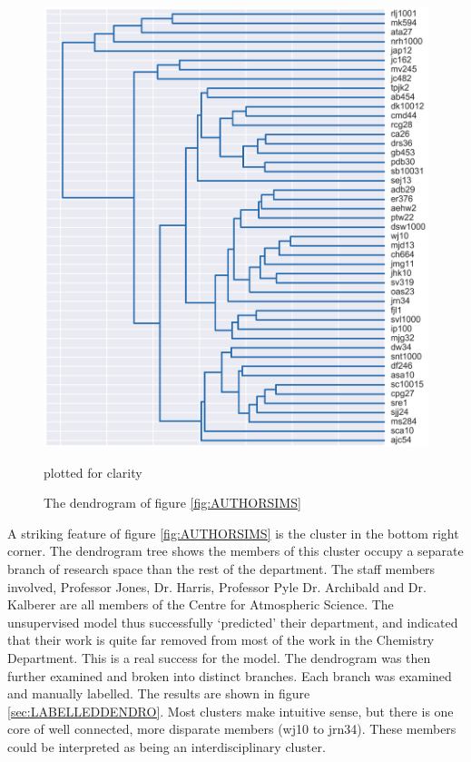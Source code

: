 \begin{center}
\begin{figure}[H]
\label{fig:DENDRO}
  \centering
    \includegraphics[scale=0.8]{Analysis/dendro.png}
    \caption{The dendrogram of figure \ref{fig:AUTHORSIMS}} plotted for clarity
\end{figure} 
\end{center}
A striking feature of figure \ref{fig:AUTHORSIMS} is the cluster in the bottom right corner. The dendrogram tree shows the members of this cluster occupy a separate branch of research space than the rest of the department. The staff members involved, Professor Jones, Dr. Harris, Professor Pyle Dr. Archibald and Dr. Kalberer are all members of the Centre for Atmospheric Science. The unsupervised model thus successfully `predicted' their department, and indicated that their work is quite far removed from most of the work in the Chemistry Department. This is a real success for the model. The dendrogram was then further examined and broken into distinct branches. Each branch was examined and manually labelled. The results are shown in figure \ref{sec:LABELLEDDENDRO}. Most clusters make intuitive sense, but there is one core of well connected, more disparate members (wj10 to jrn34). These members could be interpreted as being an interdisciplinary cluster.  
